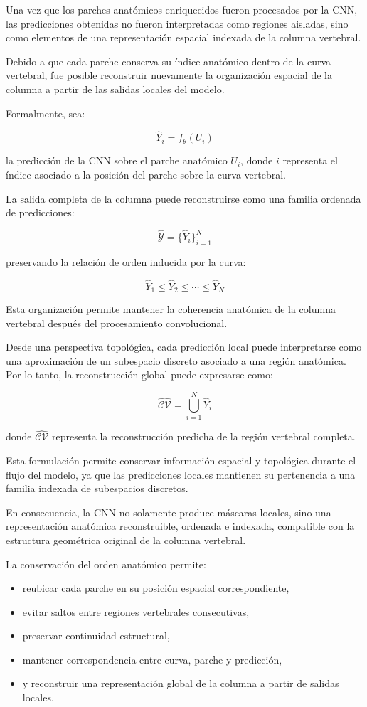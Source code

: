 \documentclass[conference]{IEEEtran}
\begin{document}
Una vez que los parches anatómicos enriquecidos fueron procesados por la CNN, las predicciones obtenidas no fueron interpretadas como regiones aisladas, sino como elementos de una representación espacial indexada de la columna vertebral.

Debido a que cada parche conserva su índice anatómico dentro de la curva vertebral, fue posible reconstruir nuevamente la organización espacial de la columna a partir de las salidas locales del modelo.

Formalmente, sea:

\[
\hat{Y}_i = f_\theta(U_i)
\]

la predicción de la CNN sobre el parche anatómico \(U_i\), donde \(i\) representa el índice asociado a la posición del parche sobre la curva vertebral.

La salida completa de la columna puede reconstruirse como una familia ordenada de predicciones:

\[
\hat{\mathcal{Y}} =
\{\hat{Y}_i\}_{i=1}^{N}
\]

preservando la relación de orden inducida por la curva:

\[
\hat{Y}_1 \leq \hat{Y}_2 \leq \cdots \leq \hat{Y}_N
\]

Esta organización permite mantener la coherencia anatómica de la columna vertebral después del procesamiento convolucional.

Desde una perspectiva topológica, cada predicción local puede interpretarse como una aproximación de un subespacio discreto asociado a una región anatómica. Por lo tanto, la reconstrucción global puede expresarse como:

\[
\hat{\mathcal{CV}}
=
\bigcup_{i=1}^{N} \hat{Y}_i
\]

donde \(\hat{\mathcal{CV}}\) representa la reconstrucción predicha de la región vertebral completa.

Esta formulación permite conservar información espacial y topológica durante el flujo del modelo, ya que las predicciones locales mantienen su pertenencia a una familia indexada de subespacios discretos.

En consecuencia, la CNN no solamente produce máscaras locales, sino una representación anatómica reconstruible, ordenada e indexada, compatible con la estructura geométrica original de la columna vertebral.

La conservación del orden anatómico permite:

\begin{itemize}
    \item reubicar cada parche en su posición espacial correspondiente,
    \item evitar saltos entre regiones vertebrales consecutivas,
    \item preservar continuidad estructural,
    \item mantener correspondencia entre curva, parche y predicción,
    \item y reconstruir una representación global de la columna a partir de salidas locales.
\end{itemize}
\end{document}
